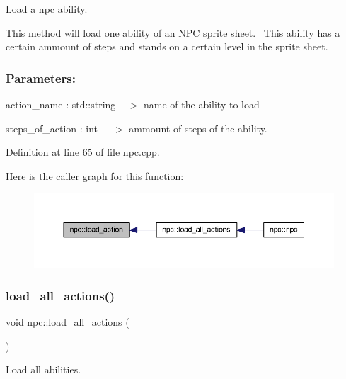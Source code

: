 Load a npc ability. 

This method will load one ability of an N\+PC sprite sheet.~\newline
This ability has a certain ammount of steps and stands on a certain level in the sprite sheet.~\newline
 \subsubsection*{Parameters\+: }

action\+\_\+name \+: std\+::string~\newline
-\/$>$ name of the ability to load

steps\+\_\+of\+\_\+action \+: int ~\newline
-\/$>$ ammount of steps of the ability. ~\newline


Definition at line 65 of file npc.\+cpp.

Here is the caller graph for this function\+:
\nopagebreak
\begin{figure}[H]
\begin{center}
\leavevmode
\includegraphics[width=350pt]{classnpc_a3f32867195150317774af508034f0a41_icgraph}
\end{center}
\end{figure}
\mbox{\label{classnpc_a357fc1c053fb6fe0e09c03d72f63191a}} 
\subsubsection{\texorpdfstring{load\+\_\+all\+\_\+actions()}{load\_all\_actions()}}
{\footnotesize\ttfamily void npc\+::load\+\_\+all\+\_\+actions (\begin{DoxyParamCaption}{ }\end{DoxyParamCaption})\hspace{0.3cm}{\ttfamily [private]}}



Load all abilities. 

